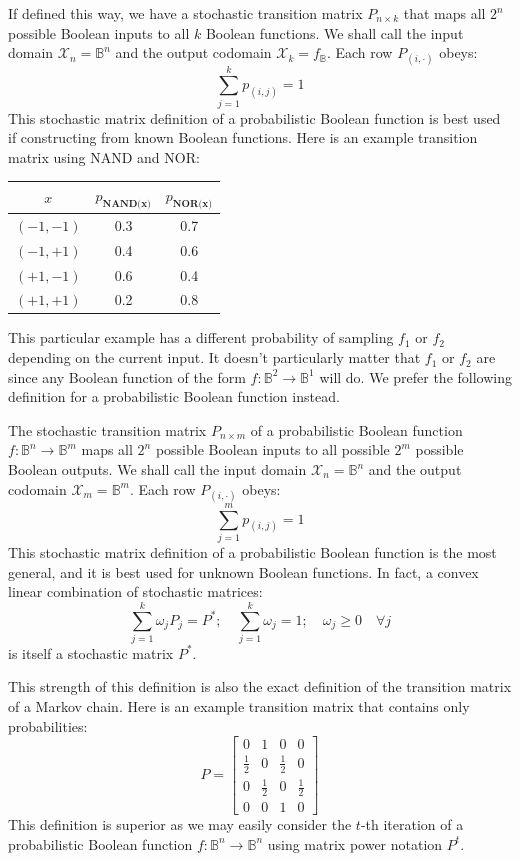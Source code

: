 \documentclass[10pt, a5paper, twoside, openright]{memoir}
\begin{document}
If defined this way, we have a stochastic transition matrix $P_{n \times k}$ that maps all $2^n$ possible Boolean inputs to all $k$ Boolean functions. We shall call the input domain $\mathcal X_n = \mathbb B^n$ and the output codomain $\mathcal X_k = f_{\mathbb B}$. Each row $P_{(i, \cdot)}$ obeys:
$$ \sum\limits_{j=1}^k p_{(i, j)} = 1$$
This stochastic matrix definition of a probabilistic Boolean function is best used if constructing from known Boolean functions. Here is an example transition matrix using NAND and NOR:
\begin{center}
\begin{tabular}{|c || c | c |}
\hline
$x$ & $p_\textbf{NAND(x)}$ & $ p_\textbf{NOR(x)}$\\
\hline
$(-1, -1)$ & 0.3 & 0.7\\
$(-1, +1)$ & 0.4 & 0.6\\
$(+1, -1)$ & 0.6 & 0.4\\
$(+1, +1)$ & 0.2 & 0.8\\
\hline
\end{tabular}
\end{center}
This particular example has a different probability of sampling $f_1$ or $f_2$ depending on the current input. It doesn't particularly matter that $f_1$ or $f_2$ are since any Boolean function of the form $f: \mathbb B^2 \rightarrow \mathbb B^1$ will do. We prefer the following definition for a probabilistic Boolean function instead.

The stochastic transition matrix $P_{n \times m}$ of a probabilistic Boolean function $f:\mathbb B^n \rightarrow \mathbb B^m$ maps all $2^n$ possible Boolean inputs to all possible $2^m$ possible Boolean outputs. We shall call the input domain $\mathcal X_n = \mathbb B^n$ and the output codomain $\mathcal X_m = \mathbb B^m$. Each row $P_{(i, \cdot)}$ obeys:
$$ \sum\limits_{j=1}^m p_{(i, j)} = 1$$
This stochastic matrix definition of a probabilistic Boolean function is the most general, and it is best used for unknown Boolean functions. In fact, a convex linear combination of stochastic matrices:
$$\sum\limits_{j=1}^{k} \omega_j P_j = P^*; \quad \sum\limits_{j=1}^k \omega_j=1; \quad \omega_j \geq 0 \quad \forall j$$
is itself a stochastic matrix $P^*$. 

This strength of this definition is also the exact definition of the transition matrix of a Markov chain. Here is an example transition matrix that contains only probabilities:
$$P = 
\begin{bmatrix}
0 & 1 & 0 & 0 \\
\frac{1}{2} & 0 & \frac{1}{2} & 0\\
0 & \frac{1}{2} & 0 & \frac{1}{2}\\
0 & 0 & 1 & 0
\end{bmatrix}
$$
This definition is superior as we may easily consider the $t$-th iteration of a probabilistic Boolean function $f:\mathbb B^n \rightarrow \mathbb B^n$ using matrix power notation $P^t$. 
\end{document}
